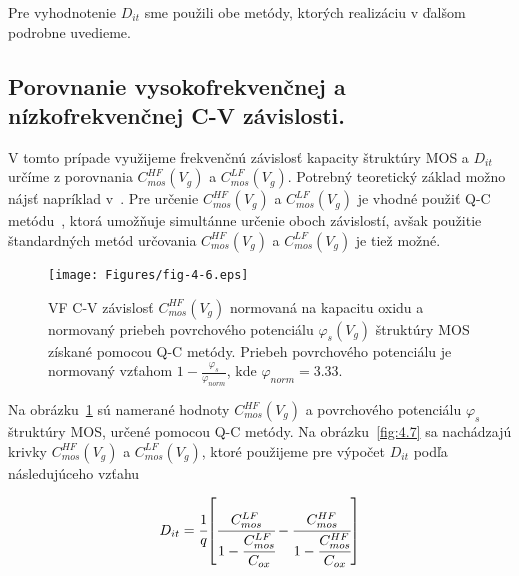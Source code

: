 Pre vyhodnotenie $D_{it}$ sme použili obe metódy, ktorých realizáciu v
ďalšom podrobne uvedieme.

\subsection{Porovnanie vysokofrekvenčnej a nízkofrekvenčnej C-V závislosti.}\label{sec:4.2.1}

V tomto prípade využijeme frekvenčnú závislosť kapacity štruktúry MOS
a $D_{it}$ určíme z porovnania $C_{mos}^{HF}(V_{g})$ a
$C_{mos}^{LF}(V_{g})$. Potrebný teoretický základ možno nájsť
napríklad v~\cite{I.1}.  Pre určenie $C_{mos}^{HF}(V_{g})$ a
$C_{mos}^{LF}(V_{g})$ je vhodné použiť Q-C metódu~\cite{3.4, 3.6, 3.7,
  3.8}, ktorá umožňuje simultánne určenie oboch závislostí, avšak
použitie štandardných metód určovania $C_{mos}^{HF}(V_{g})$ a
$C_{mos}^{LF}(V_{g})$ je tiež možné.

\begin{figure}[h!]\centering
  \begin{minipage}[c]{\myfiguresize}
    \begin{center}
      \texttt{[image: Figures/fig-4-6.eps]}
      \caption[VF C-V závislosť $C_{mos}^{HF}(V_{g})$ a priebeh
        povrchového potenciálu $\varphi_{s}(V_{g})$ štruktúry MOS
        získané pomocou Q-C metódy]{VF C-V závislosť
        $C_{mos}^{HF}(V_{g})$ normovaná na kapacitu oxidu a normovaný
        priebeh povrchového potenciálu $\varphi_{s}(V_{g})$ štruktúry
        MOS získané pomocou Q-C metódy.  Priebeh povrchového
        potenciálu je normovaný vzťahom
        $1-\frac{\varphi_{s}}{\varphi_{norm}}$, kde
        $\varphi_{norm}=3.33$.}\label{fig:4.6}
    \end{center}
  \end{minipage}
\end{figure}

Na obrázku~\ref{fig:4.6} sú namerané hodnoty $C_{mos}^{HF}(V_{g})$ a
povrchového potenciálu $\varphi_{s}$ štruktúry MOS, určené pomocou Q-C
metódy. Na obrázku~\ref{fig:4.7} sa nachádzajú krivky
$C_{mos}^{HF}(V_{g})$ a $C_{mos}^{LF}(V_{g})$, ktoré použijeme pre
výpočet $D_{it}$ podľa následujúceho vzťahu~\cite{4.15}

\begin{equation}\label{eq:4.15}
  D_{it} = {\cfrac{1}{q}} {\left[\cfrac{C_{mos}^{LF}}{1-\cfrac{C_{mos}^{LF}}{C_{ox}}} - \cfrac{C_{mos}^{HF}}{1-\cfrac{C_{mos}^{HF}}{C_{ox}}}\right]}
\end{equation}


